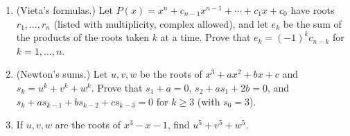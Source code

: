 \begin{enumerate}
\item[(a)] (Vieta's formulas.) Let $P(x)=x^n+c_{n-1}x^{n-1}+\cdots+c_1x+c_0$ have roots $r_1,\dots,r_n$ (listed with multiplicity, complex allowed), and let $e_k$ be the sum of the products of the roots taken $k$ at a time. Prove that $e_k=(-1)^kc_{n-k}$ for $k=1,\dots,n$.
\item[(b)] (Newton's sums.) Let $u,v,w$ be the roots of $x^3+ax^2+bx+c$ and $s_k=u^k+v^k+w^k$. Prove that $s_1+a=0$, $s_2+as_1+2b=0$, and $s_k+as_{k-1}+bs_{k-2}+cs_{k-3}=0$ for $k\ge3$ (with $s_0=3$).
\item[(c)] If $u,v,w$ are the roots of $x^3-x-1$, find $u^5+v^5+w^5$.
\end{enumerate}
